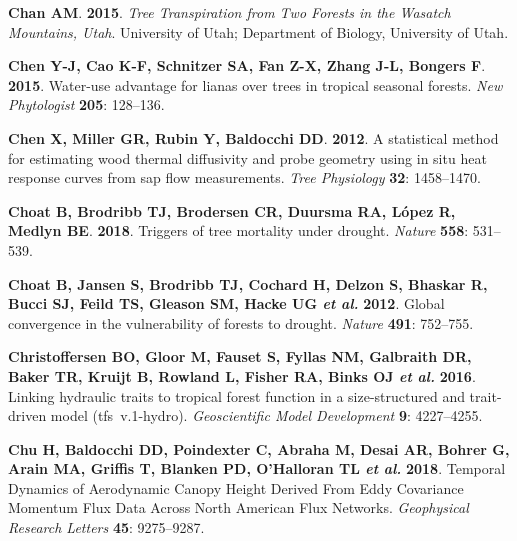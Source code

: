 \documentclass[11pt,twoside]{reedthesis}
\begin{document}
\hypertarget{ref-Chan2015}{}
\textbf{\textnormal{Chan AM}}. \textbf{2015}. \emph{Tree Transpiration
from Two Forests in the Wasatch Mountains, Utah}. University of Utah;
Department of Biology, University of Utah.

\hypertarget{ref-Chen2015}{}
\textbf{\textnormal{Chen Y-J}, \textnormal{Cao K-F},
\textnormal{Schnitzer SA}, \textnormal{Fan Z-X}, \textnormal{Zhang J-L},
\textnormal{Bongers F}}. \textbf{2015}. Water-use advantage for lianas
over trees in tropical seasonal forests. \emph{New Phytologist}
\textbf{205}: 128--136.

\hypertarget{ref-Chen2012}{}
\textbf{\textnormal{Chen X}, \textnormal{Miller GR}, \textnormal{Rubin
Y}, \textnormal{Baldocchi DD}}. \textbf{2012}. A statistical method for
estimating wood thermal diffusivity and probe geometry using in situ
heat response curves from sap flow measurements. \emph{Tree Physiology}
\textbf{32}: 1458--1470.

\hypertarget{ref-choat_triggers_2018}{}
\textbf{\textnormal{Choat B}, \textnormal{Brodribb TJ},
\textnormal{Brodersen CR}, \textnormal{Duursma RA}, \textnormal{López
R}, \textnormal{Medlyn BE}}. \textbf{2018}. Triggers of tree mortality
under drought. \emph{Nature} \textbf{558}: 531--539.

\hypertarget{ref-choat_global_2012}{}
\textbf{\textnormal{Choat B}, \textnormal{Jansen S},
\textnormal{Brodribb TJ}, \textnormal{Cochard H}, \textnormal{Delzon S},
\textnormal{Bhaskar R}, \textnormal{Bucci SJ}, \textnormal{Feild TS},
\textnormal{Gleason SM}, \textnormal{Hacke UG} \emph{et al.}}
\textbf{2012}. Global convergence in the vulnerability of forests to
drought. \emph{Nature} \textbf{491}: 752--755.

\hypertarget{ref-Christoffersen2016}{}
\textbf{\textnormal{Christoffersen BO}, \textnormal{Gloor M},
\textnormal{Fauset S}, \textnormal{Fyllas NM}, \textnormal{Galbraith
DR}, \textnormal{Baker TR}, \textnormal{Kruijt B}, \textnormal{Rowland
L}, \textnormal{Fisher RA}, \textnormal{Binks OJ} \emph{et al.}}
\textbf{2016}. Linking hydraulic traits to tropical forest function in a
size-structured and trait-driven model (tfs~v.1-hydro).
\emph{Geoscientific Model Development} \textbf{9}: 4227--4255.

\hypertarget{ref-chu_temporal_2018}{}
\textbf{\textnormal{Chu H}, \textnormal{Baldocchi DD},
\textnormal{Poindexter C}, \textnormal{Abraha M}, \textnormal{Desai AR},
\textnormal{Bohrer G}, \textnormal{Arain MA}, \textnormal{Griffis T},
\textnormal{Blanken PD}, \textnormal{O'Halloran TL} \emph{et al.}}
\textbf{2018}. Temporal Dynamics of Aerodynamic Canopy Height Derived
From Eddy Covariance Momentum Flux Data Across North American Flux
Networks. \emph{Geophysical Research Letters} \textbf{45}: 9275--9287.
\end{document}
